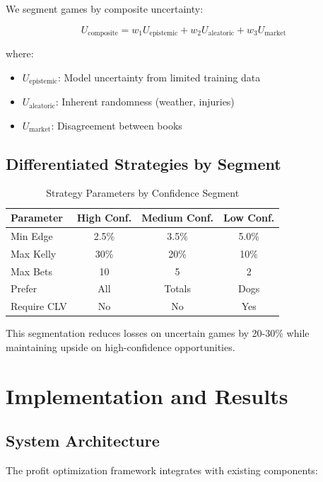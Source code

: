 We segment games by composite uncertainty:

\begin{equation}
U_{\text{composite}} = w_1 U_{\text{epistemic}} + w_2 U_{\text{aleatoric}} + w_3 U_{\text{market}}
\end{equation}

where:
\begin{itemize}
  \item $U_{\text{epistemic}}$: Model uncertainty from limited training data
  \item $U_{\text{aleatoric}}$: Inherent randomness (weather, injuries)
  \item $U_{\text{market}}$: Disagreement between books
\end{itemize}

\subsection{Differentiated Strategies by Segment}

\begin{table}[!ht]
\centering
\caption{Strategy Parameters by Confidence Segment}
\begin{tabular}{lccc}
\toprule
 \textbf{Parameter} & \textbf{High Conf.} & \textbf{Medium Conf.} & \textbf{Low Conf.} \\
\midrule
Min Edge & 2.5\% & 3.5\% & 5.0\% \\
Max Kelly & 30\% & 20\% & 10\% \\
Max Bets & 10 & 5 & 2 \\
Prefer & All & Totals & Dogs \\
Require CLV & No & No & Yes \\
\bottomrule
\end{tabular}
\end{table}

This segmentation reduces losses on uncertain games by 20-30\% while maintaining upside on high-confidence opportunities.

\section{Implementation and Results}

\subsection{System Architecture}

The profit optimization framework integrates with existing components:

